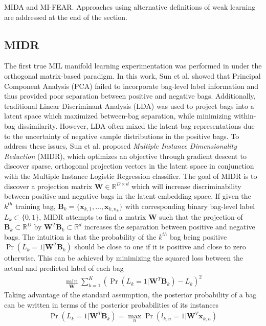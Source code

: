 MIDA and MI-FEAR.  Approaches using alternative definitions of weak learning are addressed at the end of the section.

\subsection{MIDR} 
The first true MIL manifold learning experimentation was performed in \citep{Sun2010MIDR} under the orthogonal matrix-based paradigm.  In this work, Sun et al. showed that Principal Component Analysis (PCA) failed to incorporate bag-level label information and thus provided poor separation between positive and negative bags.  Additionally, traditional Linear Discriminant Analysis (LDA) was used to project bags into a latent space which maximized between-bag separation, while minimizing within-bag dissimilarity.  However, LDA often mixed the latent bag representations due to the uncertainty of negative sample distributions in the positive bags.  To address these issues, Sun et al. proposed \textit{Multiple Instance Dimensionality Reduction} (MIDR), which optimizes an objective through gradient descent to discover sparse, orthogonal projection vectors in the latent space in conjunction with the Multiple Instance Logistic Regression classifier.  The goal of MIDR is to discover a projection matrix $\bm{W} \in \mathbb{R}^{D \times d}$ which will increase discriminability between positive and negative bags in the latent embedding space.  If given the $k^{th}$ training bag, $\bm{B}_{k} = \{ \bm{x}_{k,1}, \dots, \bm{x}_{k,n_{k}} \}$ with corresponding binary bag-level label $L_k \subset \{0,1\}$, MIDR attempts to find a matrix $\bm{W}$ such that the projection of $\bm{B}_{k} \subset \mathbb{R}^{D}$ by $\bm{W}^{T}\bm{B}_{k} \subset \mathbb{R}^{d}$ increases the separation between positive and negative bags. The intuition is that the probability of the $k^{th}$ bag being positive $\Pr(L_{k}=1|\bm{W}^{T}\bm{B}_{k})$ should be close to one if it is positive and close to zero otherwise.  This can be achieved by minimizing the squared loss between the actual and predicted label of each bag
\begin{align}
	\min_{\bm{W}} \sum_{k=1}^{K} (\Pr(L_{k}=1|\bm{W}^{T}\bm{B}_{k}) - L_{k})^{2}
	\label{eq:MIDR_orig_objective}
\end{align}
\noindent
Taking advantage of the standard assumption, the posterior probability of a bag can be written in terms of the posterior probabilities of its instances
\begin{align}
	\Pr(L_{k}=1|\bm{W}^{T}\bm{B}_{k}) = \max_{n} \Pr(l_{k,n}=1|\bm{W}^{T}\bm{x}_{k,n}) 
\end{align}
